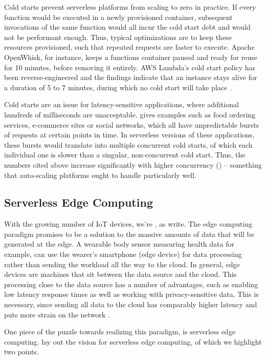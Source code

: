 Cold starts prevent serverless platforms from scaling to zero in practice. If every function would be executed in a newly provisioned container, subsequent invocations of the same function would all incur the cold start debt and would not be performant enough. Thus, typical optimizations are to keep these resources provisioned, such that repeated requests are faster to execute. Apache OpenWhisk, for instance, keeps a functions container paused and ready for reuse for 10 minutes, before removing it entirely. AWS Lambda's cold start policy has been reverse-engineered and the findings indicate that an instance stays alive for a duration of 5 to 7 minutes, during which no cold start will take place \cite{ShilCold2021}.

Cold starts are an issue for latency-sensitive applications, where additional hundreds of milliseconds are unacceptable. \citeauthor{Cui2018} gives examples such as food ordering services, e-commerce sites or social networks, which all have unpredictable bursts of requests at certain points in time. In serverless versions of these applications, these bursts would translate into multiple concurrent cold starts, of which each individual one is slower than a singular, non-concurrent cold start. Thus, the numbers cited above increase significantly with higher concurrency (\cite{Mohan2019, Cui2018}) -- something that auto-scaling platforms ought to handle particularly well.

\subsection{Serverless Edge Computing}

With the growing number of IoT devices, we're , as \citeauthor{Shi2016} write. The edge computing paradigm promises to be a solution to the massive amounts of data that will be generated at the edge. A wearable body sensor measuring health data for example, can use the wearer's smartphone (edge device) for data processing rather than sending the workload all the way to the cloud. In general, edge devices are machines that sit between the data source and the cloud. This processing close to the data source has a number of advantages, such as enabling low latency response times as well as working with privacy-sensitive data. This is necessary, since sending all data to the cloud has comparably higher latency and puts more strain on the network \cite{Shi2016}.

One piece of the puzzle towards realizing this paradigm, is serverless edge computing. \citeauthor{Aslanpour2021} lay out the vision for serverless edge computing, of which we highlight two points.

